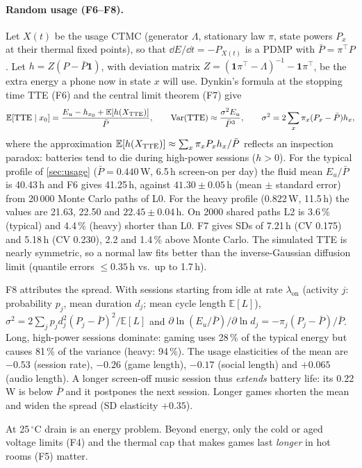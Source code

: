 \paragraph{Random usage (F6--F8).}
Let $X(t)$ be the usage CTMC (generator $\Lambda$, stationary law $\pi$, state powers $P_x$ at their thermal fixed
points), so that $\dd E/\dd t=-P_{X(t)}$ is a PDMP with $\bar P=\pi^{\top}P$. Let $h=Z(P-\bar P\mathbf 1)$, with
deviation matrix $Z=(\mathbf 1\pi^{\top}-\Lambda)^{-1}-\mathbf 1\pi^{\top}$, be the extra energy a phone now in
state $x$ will use. Dynkin's formula at the stopping time TTE (F6) and the central limit theorem (F7) give
\begin{equation}
  \mathbb E[\mathrm{TTE}\mid x_0]=\frac{E_u-h_{x_0}+\mathbb E[h(X_{\mathrm{TTE}})]}{\bar P},\qquad
  \mathrm{Var}(\mathrm{TTE})\approx\frac{\sigma^2E_u}{\bar P^3},\qquad \sigma^2=2\sum_x\pi_x(P_x-\bar P)h_x, \label{eq:F6}
\end{equation}
where the approximation $\mathbb E[h(X_{\mathrm{TTE}})]\approx\sum_x\pi_xP_xh_x/\bar P$ reflects an inspection paradox:
batteries tend to die during high-power sessions ($h>0$). For the typical profile of \cref{sec:usage}
($\bar P=0.440$\,W, 6.5\,h screen-on per day) the fluid mean $E_u/\bar P$ is 40.43\,h and F6 gives 41.25\,h,
against $41.30\pm0.05$\,h (mean $\pm$ standard error) from 20\,000 Monte Carlo paths of L0. For the heavy profile
(0.822\,W, 11.5\,h) the values are 21.63, 22.50 and $22.45\pm0.04$\,h. On 2000 shared paths L2 is 3.6\,\%
(typical) and 4.4\,\% (heavy) shorter than L0. F7 gives SDs of 7.21\,h (CV 0.175) and 5.18\,h (CV 0.230), 2.2 and
1.4\,\% above Monte Carlo. The simulated TTE is nearly symmetric, so a normal law fits better than the
inverse-Gaussian diffusion limit (quantile errors $\le0.35$\,h vs.\ up to 1.7\,h).

F8 attributes the spread. With sessions starting from idle at rate $\lambda_{\mathrm{on}}$ (activity $j$:
probability $p_j$, mean duration $d_j$; mean cycle length $\mathbb E[L]$),
$\sigma^2=2\sum_jp_jd_j^2(P_j-\bar P)^2/\mathbb E[L]$ and
$\partial\ln(E_u/\bar P)/\partial\ln d_j=-\pi_j(P_j-\bar P)/\bar P$. Long, high-power sessions dominate: gaming
uses 28\,\% of the typical energy but causes 81\,\% of the variance (heavy: 94\,\%). The usage elasticities of the
mean are $-0.53$ (session rate), $-0.26$ (game length), $-0.17$ (social length) and $+0.065$ (audio length). A
longer screen-off music session thus \emph{extends} battery life: its 0.22\,W is below $\bar P$ and it postpones
the next session. Longer games shorten the mean and widen the spread (SD elasticity $+0.35$).

\begin{keybox}
At 25\,$^\circ$C drain is an energy problem. Beyond energy, only the cold or aged voltage limits (F4) and the
thermal cap that makes games last \emph{longer} in hot rooms (F5) matter.
\end{keybox}
